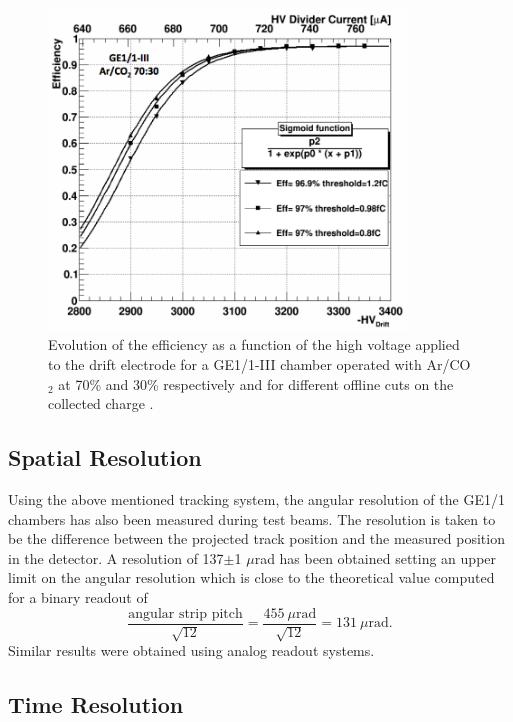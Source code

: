       \begin{figure}[t!]
        \centering
        \includegraphics[width=0.85\textwidth]{img/II-1-gem/efficiency.png}
        \caption{Evolution of the efficiency as a function of the high voltage applied to the drift electrode for a GE1/1-III chamber operated with Ar/CO$_2$ at 70\% and 30\% respectively and for different offline cuts on the collected charge \cite{Colaleo:2021453}.}
        \label{fig:II-1-efficiency-hv}
      \end{figure}

    \subsection{Spatial Resolution}

      Using the above mentioned tracking system, the angular resolution of the GE1/1 chambers has also been measured during test beams. The resolution is taken to be the difference between the projected track position and the measured position in the detector. A resolution of 137$\pm$1 $\mu$rad has been obtained setting an upper limit on the angular resolution which is close to the theoretical value computed for a binary readout of
      \begin{equation}
        \frac{\text{angular strip pitch}}{\sqrt{12}} = \frac{455\  \mu\text{rad}}{\sqrt{12}} = 131\ \mu\text{rad} .
      \end{equation}
      Similar results were obtained using analog readout systems. \\

    \subsection{Time Resolution}

